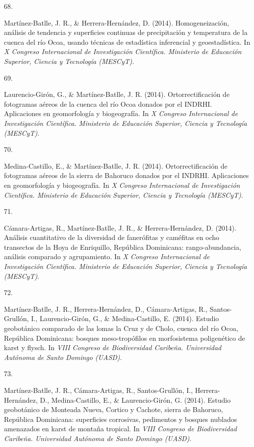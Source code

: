 \documentclass[10pt,a4paper,]{article}
\newlength{\cslhangindent}
\newlength{\csllabelwidth}
\newcommand{\CSLLeftMargin}[1]{\parbox[t]{\csllabelwidth}{\hfill #1~}}
\newcommand{\CSLRightInline}[1]{\parbox[t]{\linewidth - \cslhangindent - \csllabelwidth}{#1}\vspace{0.8ex}}
\begin{document}
\leavevmode\hypertarget{ref-Jose_Ramon_Martinez-Batlle_108101266}{}%
\CSLLeftMargin{68. }
\CSLRightInline{Martínez-Batlle, J. R., \& Herrera-Hernández, D. (2014).
Homogeneización, análisis de tendencia y superficies continuas de
precipitación y temperatura de la cuenca del río Ocoa, usando técnicas
de estadística inferencial y geoestadística. In \emph{X Congreso
Internacional de Investigación Científica. Ministerio de Educación
Superior, Ciencia y Tecnología (MESCyT)}.}

\leavevmode\hypertarget{ref-Jose_Ramon_Martinez-Batlle_108101335}{}%
\CSLLeftMargin{69. }
\CSLRightInline{Laurencio-Girón, G., \& Martínez-Batlle, J. R. (2014).
Ortorrectificación de fotogramas aéreos de la cuenca del río Ocoa
donados por el INDRHI. Aplicaciones en geomorfología y biogeografía. In
\emph{X Congreso Internacional de Investigación Científica. Ministerio
de Educación Superior, Ciencia y Tecnología (MESCyT)}.}

\leavevmode\hypertarget{ref-Jose_Ramon_Martinez-Batlle_108101339}{}%
\CSLLeftMargin{70. }
\CSLRightInline{Medina-Castillo, E., \& Martínez-Batlle, J. R. (2014).
Ortorrectificación de fotogramas aéreos de la sierra de Bahoruco donados
por el INDRHI. Aplicaciones en geomorfología y biogeografía. In \emph{X
Congreso Internacional de Investigación Científica. Ministerio de
Educación Superior, Ciencia y Tecnología (MESCyT)}.}

\leavevmode\hypertarget{ref-Jose_Ramon_Martinez-Batlle_108102009}{}%
\CSLLeftMargin{71. }
\CSLRightInline{Cámara-Artigas, R., Martínez-Batlle, J. R., \&
Herrera-Hernández, D. (2014). Análisis cuantitativo de la diversidad de
fanerófitas y caméfitas en ocho transectos de la Hoya de Enriquillo,
República Dominicana: rango-abundancia, análisis comparado y
agrupamiento. In \emph{X Congreso Internacional de Investigación
Científica. Ministerio de Educación Superior, Ciencia y Tecnología
(MESCyT)}.}

\leavevmode\hypertarget{ref-Jose_Ramon_Martinez-Batlle_108102026}{}%
\CSLLeftMargin{72. }
\CSLRightInline{Martínez-Batlle, J. R., Herrera-Hernández, D.,
Cámara-Artigas, R., Santos-Grullón, I., Laurencio-Girón, G., \&
Medina-Castillo, E. (2014). Estudio geobotánico comparado de las lomas
la Cruz y de Cholo, cuenca del río Ocoa, República Dominicana: bosques
meso-tropófilos en morfosistema poligenético de karst y flysch. In
\emph{VIII Congreso de Biodiversidad Caribeña. Universidad Autónoma de
Santo Domingo (UASD)}.}

\leavevmode\hypertarget{ref-Jose_Ramon_Martinez-Batlle_108102032}{}%
\CSLLeftMargin{73. }
\CSLRightInline{Martínez-Batlle, J. R., Cámara-Artigas, R.,
Santos-Grullón, I., Herrera-Hernández, D., Medina-Castillo, E., \&
Laurencio-Girón, G. (2014). Estudio geobotánico de Monteada Nueva,
Cortico y Cachote, sierra de Bahoruco, República Dominicana: superficies
corrosivas, pedimentos y bosques nublados amenazados en karst de montaña
tropical. In \emph{VIII Congreso de Biodiversidad Caribeña. Universidad
Autónoma de Santo Domingo (UASD)}.}
\end{document}

